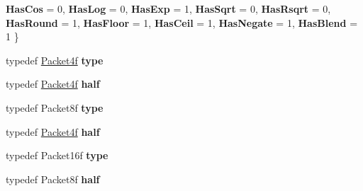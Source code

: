 \begin{DoxyCompactItemize}
\newline
{\bfseries Has\+Cos} = 0, 
{\bfseries Has\+Log} = 0, 
{\bfseries Has\+Exp} = 1, 
{\bfseries Has\+Sqrt} = 0, 
\newline
{\bfseries Has\+Rsqrt} = 0, 
{\bfseries Has\+Round} = 1, 
{\bfseries Has\+Floor} = 1, 
{\bfseries Has\+Ceil} = 1, 
\newline
{\bfseries Has\+Negate} = 1, 
{\bfseries Has\+Blend} = 1
 \}
\item 
\mbox{\label{struct_eigen_1_1internal_1_1packet__traits_3_01float_01_4_a753e39039ed22b2dde1684c1f8c62985}} 
typedef \mbox{\hyperlink{struct_eigen_1_1internal_1_1_packet4f}{Packet4f}} {\bfseries type}
\item 
\mbox{\label{struct_eigen_1_1internal_1_1packet__traits_3_01float_01_4_ae218bb63db50937a710084a1ed9747c0}} 
typedef \mbox{\hyperlink{struct_eigen_1_1internal_1_1_packet4f}{Packet4f}} {\bfseries half}
\item 
\mbox{\label{struct_eigen_1_1internal_1_1packet__traits_3_01float_01_4_a27392d36d557f994efe8d88df4866656}} 
typedef Packet8f {\bfseries type}
\item 
\mbox{\label{struct_eigen_1_1internal_1_1packet__traits_3_01float_01_4_ae218bb63db50937a710084a1ed9747c0}} 
typedef \mbox{\hyperlink{struct_eigen_1_1internal_1_1_packet4f}{Packet4f}} {\bfseries half}
\item 
\mbox{\label{struct_eigen_1_1internal_1_1packet__traits_3_01float_01_4_ab948cae83ab260558556a8941e985b6b}} 
typedef Packet16f {\bfseries type}
\item 
\mbox{\label{struct_eigen_1_1internal_1_1packet__traits_3_01float_01_4_a1ea1055ec4df15373a78c6827648a4d4}} 
typedef Packet8f {\bfseries half}
\item 
\mbox{\label{struct_eigen_1_1internal_1_1packet__traits_3_01float_01_4_a753e39039ed22b2dde1684c1f8c62985}} 

\end{DoxyCompactItemize}
